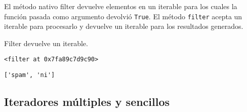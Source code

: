 El método nativo filter devuelve elementos en un iterable para los
cuales la función pasada como argumento devolvió \texttt{True}. El
método \texttt{filter} acepta un iterable para procesarlo y devuelve un
iterable para los resultados generados.
\\
\begin{code} Filter devuelve un iterable.
\begin{Shaded}
\begin{Highlighting}[]
\NormalTok{(}\NormalTok{, [}\NormalTok{, }\StringTok{\textquotesingle{}\textquotesingle{}}\NormalTok{, }\NormalTok{])}
\end{Highlighting}
\end{Shaded}

\begin{verbatim}
<filter at 0x7fa89c7d9c90>
\end{verbatim}

\begin{Shaded}
\begin{Highlighting}[]
\NormalTok{(}\NormalTok{(}\NormalTok{, [}\NormalTok{, }\StringTok{\textquotesingle{}\textquotesingle{}}\NormalTok{, }\NormalTok{]))}
\end{Highlighting}
\end{Shaded}

\begin{verbatim}
['spam', 'ni']
\end{verbatim}
\end{code}

\subsection{Iteradores múltiples y sencillos}

